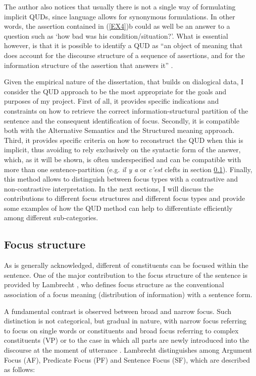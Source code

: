 \documentclass[12pt]{report}
\begin{document}
The author also notices that usually there is not a single way of formulating implicit QUDs, since language allows for synonymous formulations. In other words, the assertion contained in (\ref{EX4})b could as well be an answer to a question such as ‘how bad was his condition/situation?’.
 What is essential however, is that it is possible to identify a QUD as “an object of meaning that does account for the discourse structure of a sequence of assertions, and for the information structure of the assertion that answers it” \cite{riester2019constructing}.

Given the empirical nature of the dissertation, that builds on dialogical data, I consider the QUD approach to be the most appropriate for the goals and purposes of my project. First of all, it provides specific indications and constraints on how to retrieve the correct information-structural partition of the sentence and the consequent identification of focus. Secondly, it is compatible both with the Alternative Semantics and the Structured meaning approach. Third, it provides specific criteria on how to reconstruct the QUD when this is implicit, thus avoiding to rely exclusively on the syntactic form of the answer, which, as it will be shown, is often underspecified and can be compatible with more than one sentence-partition (e.g. \textit{il y a} or \textit{c'est} clefts in section \ref{structure}). Finally, this method allows to distinguish between focus types with a contrastive and non-contrastive interpretation. In the next sections, I will discuss the contributions to different focus structures and different focus types and provide some examples of how the QUD method can help to differentiate efficiently among different sub-categories.\\




\subsection{Focus structure} \label{structure}


As is generally acknowledged, different  of constituents can be focused within the sentence. One of the major contribution to the focus structure of the sentence is provided by Lambrecht \cite{lambrecht1996information}, who defines focus structure as the conventional association of a focus meaning (distribution of information) with a sentence form.

A fundamental contrast is observed between broad and narrow focus.
Such distinction is not categorical, but gradual in nature, with narrow focus referring to focus on single words or constituents and broad focus referring to complex constituents (VP) or to the case in which all parts are newly introduced into the discourse at the moment of utterance \cite{fery2008information}.
Lambrecht \cite{lambrecht2000subjects} distinguishes among Argument Focus (AF), Predicate Focus (PF) and Sentence Focus (SF), which are described as follows:
\end{document}
